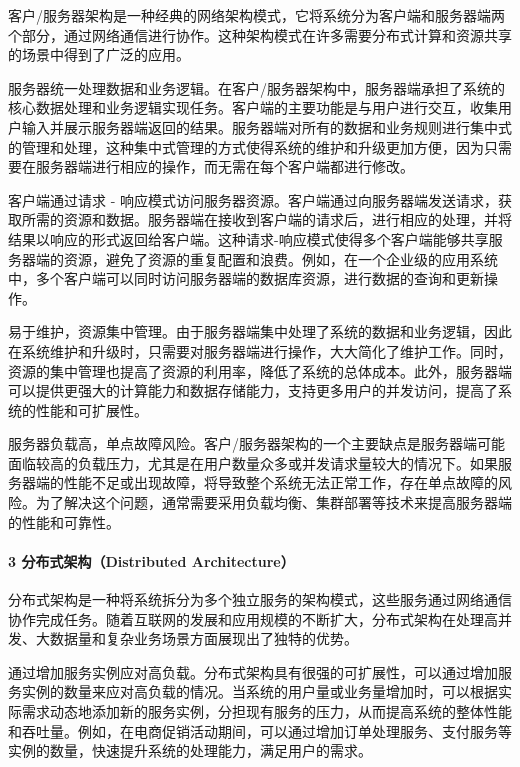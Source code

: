 客户/服务器架构是一种经典的网络架构模式，它将系统分为客户端和服务器端两个部分，通过网络通信进行协作。这种架构模式在许多需要分布式计算和资源共享的场景中得到了广泛的应用。


服务器统一处理数据和业务逻辑。在客户/服务器架构中，服务器端承担了系统的核心数据处理和业务逻辑实现任务。客户端的主要功能是与用户进行交互，收集用户输入并展示服务器端返回的结果。服务器端对所有的数据和业务规则进行集中式的管理和处理，这种集中式管理的方式使得系统的维护和升级更加方便，因为只需要在服务器端进行相应的操作，而无需在每个客户端都进行修改。

客户端通过请求 - 响应模式访问服务器资源。客户端通过向服务器端发送请求，获取所需的资源和数据。服务器端在接收到客户端的请求后，进行相应的处理，并将结果以响应的形式返回给客户端。这种请求-响应模式使得多个客户端能够共享服务器端的资源，避免了资源的重复配置和浪费。例如，在一个企业级的应用系统中，多个客户端可以同时访问服务器端的数据库资源，进行数据的查询和更新操作。


易于维护，资源集中管理。由于服务器端集中处理了系统的数据和业务逻辑，因此在系统维护和升级时，只需要对服务器端进行操作，大大简化了维护工作。同时，资源的集中管理也提高了资源的利用率，降低了系统的总体成本。此外，服务器端可以提供更强大的计算能力和数据存储能力，支持更多用户的并发访问，提高了系统的性能和可扩展性。

服务器负载高，单点故障风险。客户/服务器架构的一个主要缺点是服务器端可能面临较高的负载压力，尤其是在用户数量众多或并发请求量较大的情况下。如果服务器端的性能不足或出现故障，将导致整个系统无法正常工作，存在单点故障的风险。为了解决这个问题，通常需要采用负载均衡、集群部署等技术来提高服务器端的性能和可靠性。

\hypertarget{ux5206ux5e03ux5f0fux67b6ux6784distributed-architecture}{%
\paragraph{3 分布式架构（Distributed Architecture）}\label{ux5206ux5e03ux5f0fux67b6ux6784distributed-architecture}}

分布式架构是一种将系统拆分为多个独立服务的架构模式，这些服务通过网络通信协作完成任务。随着互联网的发展和应用规模的不断扩大，分布式架构在处理高并发、大数据量和复杂业务场景方面展现出了独特的优势。


通过增加服务实例应对高负载。分布式架构具有很强的可扩展性，可以通过增加服务实例的数量来应对高负载的情况。当系统的用户量或业务量增加时，可以根据实际需求动态地添加新的服务实例，分担现有服务的压力，从而提高系统的整体性能和吞吐量。例如，在电商促销活动期间，可以通过增加订单处理服务、支付服务等实例的数量，快速提升系统的处理能力，满足用户的需求。

